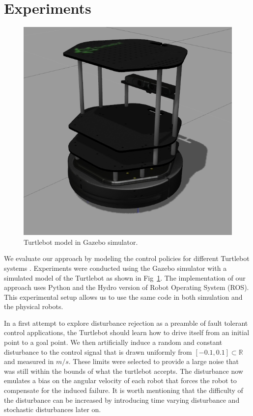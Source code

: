 \documentclass{aamas2016}
\renewcommand{\Re}{\mathbb{R}}
\begin{document}
\section{Experiments} \label{Experiments}

\begin{figure}[!htbp]
    \centering
        \includegraphics[width=.45\textwidth]{images/turtlebotsim_crop.png}
        \caption{Turtlebot model in Gazebo simulator.}\label{fig:gazebo}
\end{figure}

We evaluate our approach by modeling the control policies for different Turtlebot systems \cite{Turtlebot-2016}. 
Experiments were conducted using the Gazebo simulator \cite{Gazebo-2016,ROS-2016} with a simulated model of the Turtlebot as shown in Fig~\ref{fig:gazebo}. 
The implementation of our approach uses Python and the Hydro version of Robot Operating System (ROS).
This experimental setup allows us to use the same code in both simulation and the physical robots.

In a first attempt to explore disturbance rejection as a preamble of
fault tolerant control applications, the Turtlebot should learn how to drive itself from an initial point to a goal point.
We then artificially induce a random and constant disturbance to the control signal that is drawn uniformly from 
$[-0.1, 0.1] \subset \Re$ and measured in $m/s$. These limits were selected to provide a large noise that was still within the bounds of what the turtlebot accepts.
The disturbance now emulates a bias on the angular velocity of each robot that forces the robot to
compensate for the induced failure. It is worth mentioning that the difficulty of the disturbance can be increased by introducing
time varying disturbance and stochastic disturbances later on.
\end{document}
